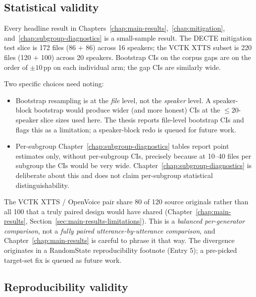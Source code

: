 \subsection{Statistical validity}
\label{sec:discussion-statistical-validity}

Every headline result in Chapters~\ref{chap:main-results},~\ref{chap:mitigation}, and~\ref{chap:subgroup-diagnostics} is a small-sample
result. The DECTE mitigation test slice is 172 files (86 + 86)
across 16 speakers; the VCTK XTTS subset is 220 files (120 + 100)
across 20 speakers. Bootstrap CIs on the corpus gaps are on the
order of $\pm 10$\,pp on each individual arm; the gap CIs are similarly
wide.

Two specific choices need noting:

\begin{itemize}
    \item Bootstrap resampling is at the \emph{file} level, not the \emph{speaker}
        level. A speaker-block bootstrap would produce wider (and more
        honest) CIs at the $\leq 20$-speaker slice sizes used here. The
        thesis reports file-level bootstrap CIs and flags this as a
        limitation; a speaker-block redo is queued for future work.
    \item Per-subgroup Chapter~\ref{chap:subgroup-diagnostics} tables report point estimates only,
        without per-subgroup CIs, precisely because at 10--40 files per
        subgroup the CIs would be very wide. Chapter~\ref{chap:subgroup-diagnostics} is deliberate
        about this and does not claim per-subgroup statistical
        distinguishability.
\end{itemize}

The VCTK XTTS / OpenVoice pair share 80 of 120 source originals
rather than all 100 that a truly paired design would have shared
(Chapter~\ref{chap:main-results}, Section~\ref{sec:main-results-limitations}). This is a \emph{balanced per-generator
comparison}, not a \emph{fully paired utterance-by-utterance
comparison}, and Chapter~\ref{chap:main-results} is careful to phrase it that way. The
divergence originates in a RandomState reproducibility footnote
(Entry 5); a pre-picked target-set fix is queued as future work.

\subsection{Reproducibility validity}
\label{sec:discussion-reproducibility-validity}

